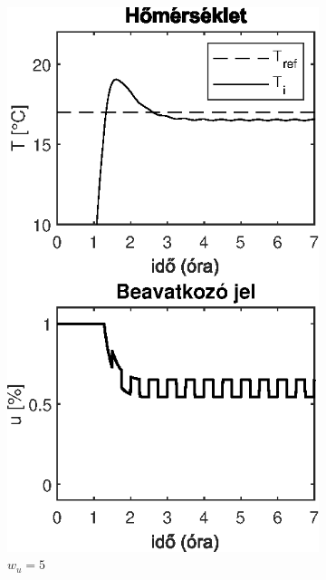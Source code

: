 \begin{figure}[H]
\begin{subfigure}[t]{0.32\textwidth}
	\includegraphics[width=\textwidth]{figures/realsys/mpc-wu-05}
	\caption{$w_u=5$}
	\label{fig:mpc-wu-05}
\end{subfigure}
~
\begin{subfigure}[t]{0.32\textwidth}
	\centering

\end{subfigure}
\end{figure}
